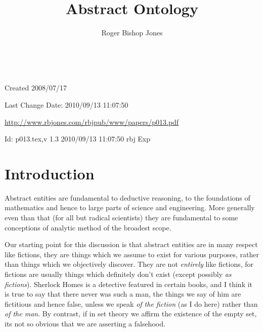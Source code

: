 \documentclass[numreferences]{book}
\title{Abstract Ontology}
\author{Roger Bishop Jones}
\date{\ }
\begin{document}
                                                    
\frontmatter
\begin{titlepage}
\maketitle


\vfill

\begin{centering}

\footnotesize{
Created 2008/07/17

Last Change $ $Date: 2010/09/13 11:07:50 $ $

\href{http://www.rbjones.com/rbjpub/www/papers/p013.pdf}{http://www.rbjones.com/rbjpub/www/papers/p013.pdf}

$ $Id: p013.tex,v 1.3 2010/09/13 11:07:50 rbj Exp $ $\\

}%
\end{centering}
\end{titlepage}

\newpage
\setcounter{tocdepth}{3}
{\parskip-0pt\tableofcontents}

\mainmatter
\section{Introduction}

Abstract entities are fundamental to deductive reasoning, to the foundations of mathematics and hence to large parts of science and engineering.
More generally even than that (for all but radical scientists) they are fundamental to some conceptions of analytic method of the broadest scope.

Our starting point for this discussion is that abstract entities are in many respect like fictions, they are things which we assume to exist for various purposes, rather than things which we objectively discover.
They are not \emph{entirely} like fictions, for fictions are usually things which definitely don't exist (except possibly \emph{as fictions}).
Sherlock Homes is a detective featured in certain books, and I think it is true to say that there never was such a man, the things we say of him are fictitious and hence false, unless we speak \emph{of the fiction} (as I do here) rather than \emph{of the man}.
By contrast, if in set theory we affirm the existence of the empty set, its not so obvious that we are asserting a falsehood.
\end{document}
